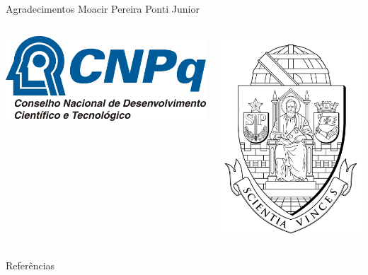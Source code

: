 \documentclass{beamer}
\begin{document}
\begin{frame}{Agradecimentos}
  Moacir Pereira Ponti Junior

\begin{columns}
  \begin{column}{0.5\textwidth}
  \centering
    \includegraphics[width=0.6\columnwidth]{figuras/cnpqLogo.jpg}
  \end{column}
  \begin{column}{0.5\textwidth}
  \centering
    \includegraphics[width=0.6\columnwidth]{figuras/brasao_usp_pb}
  \end{column}
\end{columns}
\end{frame}
\nocite{*}
\begin{frame}[allowframebreaks]{Referências}
\tiny
% 

%

\end{frame}

\begin{frame}[plain]
  \maketitle
\end{frame}
\end{document}
